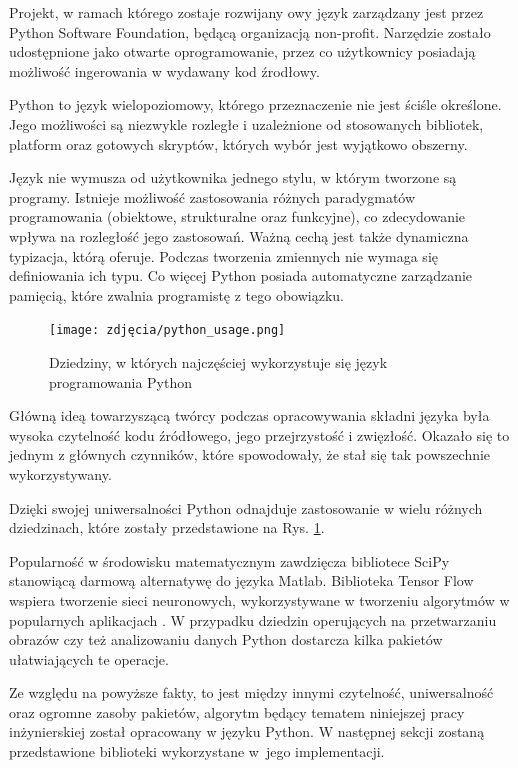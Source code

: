 Projekt, w ramach którego zostaje rozwijany owy język zarządzany jest przez Python Software Foundation, będącą organizacją non-profit. Narzędzie zostało udostępnione jako otwarte oprogramowanie, przez co użytkownicy posiadają możliwość ingerowania w wydawany kod źrodłowy.

Python to język wielopoziomowy, którego przeznaczenie nie jest ściśle określone. Jego możliwości są niezwykle rozległe i uzależnione od stosowanych bibliotek, platform oraz gotowych skryptów, których wybór jest wyjątkowo obszerny. 

Język nie wymusza od użytkownika jednego stylu, w którym tworzone są programy. Istnieje możliwość zastosowania różnych paradygmatów programowania (obiektowe, strukturalne oraz funkcyjne), co zdecydowanie wpływa na rozległość jego zastosowań. Ważną cechą jest także dynamiczna typizacja, którą oferuje. Podczas tworzenia zmiennych nie wymaga się definiowania ich typu. Co więcej Python posiada automatyczne zarządzanie pamięcią, które zwalnia programistę z tego obowiązku. 

\begin{figure}[h]
	\centering
	\texttt{[image: zdjęcia/python\_usage.png]}
	\caption{Dziedziny, w których najczęściej wykorzystuje się język programowania Python \cite{PythonApps}} 
	\label{fig:pythonUsage}
\end{figure}

Główną ideą towarzyszącą twórcy podczas opracowywania składni języka była wysoka czytelność kodu źródłowego, jego przejrzystość i zwięzłość. Okazało się to jednym z głównych czynników, które spowodowały, że stał się tak powszechnie wykorzystywany.

Dzięki swojej uniwersalności Python odnajduje zastosowanie w wielu różnych dziedzinach, które zostały przedstawione na Rys. \ref{fig:pythonUsage}. 

Popularność w środowisku matematycznym zawdzięcza bibliotece SciPy stanowiącą darmową alternatywę do języka Matlab. Biblioteka Tensor Flow wspiera tworzenie sieci neuronowych, wykorzystywane w tworzeniu algorytmów w popularnych aplikacjach \cite{PythonApps}. W przypadku dziedzin operujących na przetwarzaniu obrazów czy też analizowaniu danych Python dostarcza kilka pakietów ułatwiających te operacje.

Ze względu na powyższe fakty, to jest między innymi czytelność, uniwersalność oraz ogromne zasoby pakietów, algorytm będący tematem niniejszej pracy inżynierskiej został opracowany w języku Python. W następnej sekcji zostaną przedstawione biblioteki wykorzystane w~jego implementacji.

